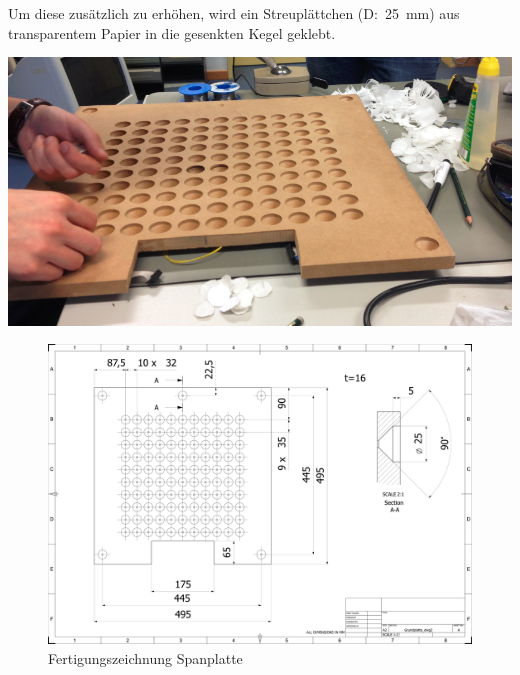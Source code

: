 \begin{multicols}{2}
{}
Um diese zusätzlich zu erhöhen, wird ein Streuplättchen (D:~25~mm) aus transparentem Papier in die gesenkten Kegel geklebt. 

{
\centering\includegraphics[width=0.85\columnwidth]{Abbildungen/Konstruktion/LED02}

}






\end{multicols}

\begin{landscape}
	\begin{figure}
		\centering
		\includegraphics[width=21cm]{Abbildungen/Konstruktion/Grundplatte}
		\caption[Spanplatte]{Fertigungszeichnung Spanplatte}
		\label{fig:Spanplatte}
	\end{figure}
\end{landscape}


